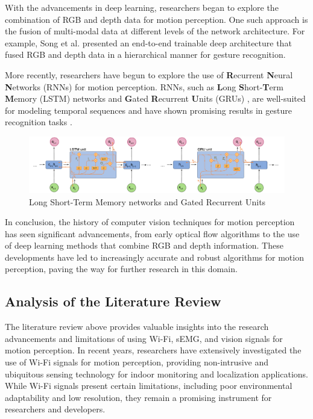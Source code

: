 \documentclass[12pt, a4paper]{article}
\begin{document}
With the advancements in deep learning, researchers began to explore the combination of RGB and depth data for motion perception. One such approach is the fusion of multi-modal data at different levels of the network architecture. For example, Song et al. \cite{song2017end} presented an end-to-end trainable deep architecture that fused RGB and depth data in a hierarchical manner for gesture recognition.

More recently, researchers have begun to explore the use of \textbf{R}ecurrent \textbf{N}eural \textbf{N}etworks (RNNs) for motion perception. RNNs, such as \textbf{L}ong \textbf{S}hort-\textbf{T}erm \textbf{M}emory (LSTM) networks \cite{graves2012long} and \textbf{G}ated \textbf{R}ecurrent \textbf{U}nits (GRUs) \cite{cho2014learning}, are well-suited for modeling temporal sequences and have shown promising results in gesture recognition tasks \cite{donahue2015long}.

\begin{figure}[ht!]
    \centering
    \includegraphics[width=1.0\textwidth]{image/lstm_gru.pdf}
    \caption{Long Short-Term Memory networks and Gated Recurrent Units}
    \label{fig:lstm_gru}
\end{figure}

In conclusion, the history of computer vision techniques for motion perception has seen significant advancements, from early optical flow algorithms to the use of deep learning methods that combine RGB and depth information. These developments have led to increasingly accurate and robust algorithms for motion perception, paving the way for further research in this domain.


\subsection{Analysis of the Literature Review}
The literature review above provides valuable insights into the research advancements and limitations of using Wi-Fi, sEMG, and vision signals for motion perception. In recent years, researchers have extensively investigated the use of Wi-Fi signals for motion perception, providing non-intrusive and ubiquitous sensing technology for indoor monitoring and localization applications. While Wi-Fi signals present certain limitations, including poor environmental adaptability and low resolution, they remain a promising instrument for researchers and developers.
\end{document}
